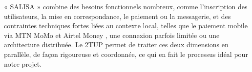 « SALISA » combine des besoins fonctionnels nombreux, comme l'inscription des utilisateurs, la mise en correspondance, le paiement ou la messagerie, et des contraintes techniques fortes liées au contexte local, telles que le paiement mobile via MTN MoMo et Airtel Money \cite{mtn_momo}, une connexion parfois limitée ou une architecture distribuée. Le 2TUP permet de traiter ces deux dimensions en parallèle, de façon rigoureuse et coordonnée, ce qui en fait le processus idéal pour notre projet.
